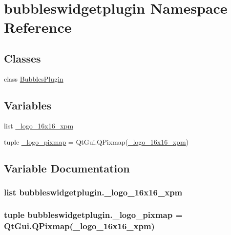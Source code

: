 \hypertarget{namespacebubbleswidgetplugin}{}\section{bubbleswidgetplugin Namespace Reference}
\label{namespacebubbleswidgetplugin}
\subsection*{Classes}
\begin{DoxyCompactItemize}
\item 
class \hyperlink{classbubbleswidgetplugin_1_1BubblesPlugin}{Bubbles\+Plugin}
\end{DoxyCompactItemize}
\subsection*{Variables}
\begin{DoxyCompactItemize}
\item 
list \hyperlink{namespacebubbleswidgetplugin_a6e88e5ba1cd1b5a2ecd76b2e89801b71}{\+\_\+logo\+\_\+16x16\+\_\+xpm}
\item 
tuple \hyperlink{namespacebubbleswidgetplugin_a33c3c088611dab9237f821b87a853924}{\+\_\+logo\+\_\+pixmap} = Qt\+Gui.\+Q\+Pixmap(\hyperlink{namespacebubbleswidgetplugin_a6e88e5ba1cd1b5a2ecd76b2e89801b71}{\+\_\+logo\+\_\+16x16\+\_\+xpm})
\end{DoxyCompactItemize}


\subsection{Variable Documentation}
\hypertarget{namespacebubbleswidgetplugin_a6e88e5ba1cd1b5a2ecd76b2e89801b71}{}
\subsubsection[{\+\_\+logo\+\_\+16x16\+\_\+xpm}]{\setlength{\rightskip}{0pt plus 5cm}list bubbleswidgetplugin.\+\_\+logo\+\_\+16x16\+\_\+xpm}\label{namespacebubbleswidgetplugin_a6e88e5ba1cd1b5a2ecd76b2e89801b71}
\hypertarget{namespacebubbleswidgetplugin_a33c3c088611dab9237f821b87a853924}{}
\subsubsection[{\+\_\+logo\+\_\+pixmap}]{\setlength{\rightskip}{0pt plus 5cm}tuple bubbleswidgetplugin.\+\_\+logo\+\_\+pixmap = Qt\+Gui.\+Q\+Pixmap({\bf \+\_\+logo\+\_\+16x16\+\_\+xpm})}\label{namespacebubbleswidgetplugin_a33c3c088611dab9237f821b87a853924}
